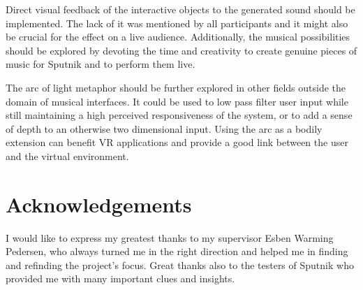 \documentclass[10pt,a4paper]{scrartcl}
\begin{document}
Direct visual feedback of the interactive objects to the generated sound should be implemented. The lack of it was mentioned by all participants and it might also be crucial for the effect on a live audience. Additionally, the musical possibilities should be explored by devoting the time and creativity to create genuine pieces of music for Sputnik and to perform them live.

The arc of light metaphor should be further explored in other fields outside the domain of musical interfaces. It could be used to low pass filter user input while still maintaining a high perceived responsiveness of the system, or to add a sense of depth to an otherwise two dimensional input. Using the arc as a bodily extension can benefit VR applications and provide a good link between the user and the virtual environment.



\section{Acknowledgements}
I would like to express my greatest thanks to my supervisor Esben Warming Pedersen, who always turned me in the right direction and helped me in finding and refinding the project's focus. Great thanks also to the testers of Sputnik who provided me with many important clues and insights. 



\clearpage


\end{document}
